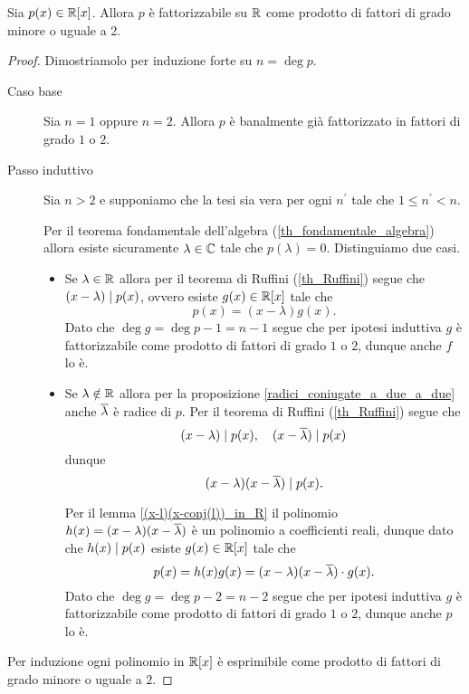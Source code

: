 \begin{proposition}
    Sia $p(x) \in \mathbb{R}[x]$. Allora $p$ è fattorizzabile su $\mathbb{R}$ come prodotto di fattori di grado minore o uguale a 2.
\end{proposition}
\begin{proof}
    Dimostriamolo per induzione forte su $n = \deg p$.

    \begin{description}
        \item[Caso base] Sia $n = 1$ oppure $n = 2$. Allora $p$ è banalmente già fattorizzato in fattori di grado $1$ o $2$.
        \item[Passo induttivo] Sia $n > 2$ e supponiamo che la tesi sia vera per ogni $n^\prime$ tale che $1 \leq n^\prime < n$.
        
        Per il teorema fondamentale dell'algebra (\ref{th_fondamentale_algebra}) allora esiste sicuramente $\lambda \in \mathbb{C}$ tale che $p(\lambda) = 0$. Distinguiamo due casi.
        \begin{itemize}
            \item Se $\lambda \in \mathbb{R}$ allora per il teorema di Ruffini (\ref{th_Ruffini}) segue che $(x-\lambda) \mid p(x)$, ovvero esiste $g(x) \in \mathbb{R}[x]$ tale che \[
                p(x) = (x-\lambda)g(x).    
            \] Dato che $\deg g = \deg p - 1 = n - 1$ segue che per ipotesi induttiva $g$ è fattorizzabile come prodotto di fattori di grado $1$ o $2$, dunque anche $f$ lo è.
            \item Se $\lambda \notin \mathbb{R}$ allora per la proposizione \ref{radici_coniugate_a_due_a_due} anche $\overline{\lambda}$ è radice di $p$. Per il teorema di Ruffini (\ref{th_Ruffini}) segue che \[
                (x-\lambda) \mid p(x),\quad (x - \overline{\lambda}) \mid p(x)
            \] dunque \[
                (x-\lambda)(x-\overline{\lambda}) \mid p(x).
            \]

            Per il lemma \ref{(x-l)(x-conj(l))_in_R} il polinomio $h(x) = (x-\lambda)(x-\overline{\lambda})$ è un polinomio a coefficienti reali, dunque dato che $h(x) \mid p(x)$ esiste $g(x) \in \mathbb{R}[x]$ tale che \[
                p(x) = h(x)g(x) = (x-\lambda)(x-\overline{\lambda}) \cdot g(x).  
            \] Dato che $\deg g = \deg p - 2 = n - 2$ segue che per ipotesi induttiva $g$ è fattorizzabile come prodotto di fattori di grado $1$ o $2$, dunque anche $p$ lo è.
        \end{itemize}
    \end{description}

    Per induzione ogni polinomio in $\mathbb{R}[x]$ è esprimibile come prodotto di fattori di grado minore o uguale a $2$.
\end{proof}

